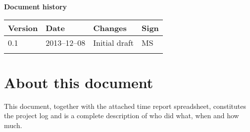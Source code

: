 \documentclass[10pt, a4paper, twoside]{article}
\begin{document}



\newpage
\pagestyle{fancy}
\setcounter{page}{2} %



\newpage
\tableofcontents
\listoffigures


\newpage
\vspace*{5\baselineskip}

\begin{center}
\textbf{\LARGE Document history}

{ \footnotesize 
\begin{tabular}{|p{1cm}|p{2.0cm}|p{6.5cm}|p{2cm}|}
	\hline
	\textbf{Version} & \textbf{Date} & \textbf{Changes} & \textbf{Sign} \\
	
	\hline
	0.1 & 2013--12--08 & Initial draft & MS \\
	\hline
	 &  &  &   \\
	
	\hline
\end{tabular}
}
\end{center}

\vspace{2cm}

\section{About this document}
\label{sec:about}

This document, together with the attached time report spreadsheet, constitutes the project log and is a complete description of who did what, when and how much.

%
%
\newpage

\newpage

\newpage

\newpage

\newpage

\end{document}
